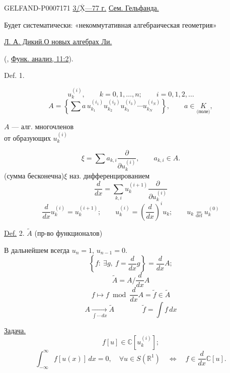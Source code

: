 \begin{GelfandAdjacentEvidence}{GELFAND-P000717}{1}
\underline{3/\(\overline{\underline{\mathrm X}}\)---77 г.}
\qquad \underline{Сем. Гельфанда.}

\begin{flushright}
Будет систематически: «некоммутативная алгебраическая геометрия»
\end{flushright}

\underline{\underline{Л. А. Дикий.}}\qquad \underline{О новых алгебрах Ли.}

(, \href{https://www.mathnet.ru/eng/faa2064}{Функ. анализ, 11:2}).

Def. 1. \quad {}

\end{GelfandAdjacentEvidence}
\par\begingroup\setlength{\parindent}{0pt}\setlength{\parskip}{.4em}\raggedright


\[
u_k^{(i)},\qquad k=0,1,\ldots,n;\qquad i=0,1,2,\ldots
\]
\[
A=\left\{\sum a\,u_{k_1}^{(i_1)}u_{k_2}^{(i_2)}u_{k_3}^{(i_3)}
\cdots u_{k_N}^{(i_N)}\right\},\qquad a\in\underset{\text{(поле)}}{K},
\]
\begin{flushright}
\(A\) --- алг. многочленов\\
от образующих \(u_k^{(i)}\)\\
\end{flushright}
\[
\xi=\sum a_{k,i}\frac{\partial}{\partial u_k^{(i)}},\qquad a_{k,i}\in A.
\]
(сумма бесконечна)\qquad \(\xi\) наз. дифференцированием
\[
\frac{d}{dx}=\sum_{k,i}u_k^{(i+1)}\frac{\partial}{\partial u_k^{(i)}}
\]
\[
\frac{d}{dx}u_k^{(i)}=u_k^{(i+1)};\qquad
u_k^{(i)}=\left(\frac{d}{dx}\right)^i u_k;\qquad
u_k\underset{\mathrm{def}}{=}u_k^{(0)}
\]

\underline{Def.} 2. \quad {} \(\widetilde A\) (пр-во функционалов)

В дальнейшем всегда \(u_n=1\), \(u_{n-1}=0\).
\[
\left\{f:\ \exists g,\ f=\frac{d}{dx}g\right\}=\frac{d}{dx}A;
\]
\[
\widetilde A=A\big/\frac{d}{dx}A
\]
\[
f\longmapsto f\bmod\frac{d}{dx}A=\widetilde f\in\widetilde A
\]
\[
A\underset{\int\cdots\,dx}{\longrightarrow}\widetilde A
\qquad\qquad
\widetilde f=\int f\,dx
\]

\underline{Задача.}
\[
f[u]\in\mathbb C[u_k^{(i)}];
\]
\[
\int_{-\infty}^{\infty}f[u(x)]\,dx=0,\quad\forall u\in S(\mathbb R^1)
\quad\Longleftrightarrow\quad
f\in\frac{d}{dx}\mathbb C[u].
\]

